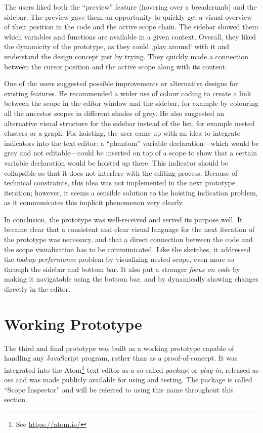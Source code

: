 The users liked both the “preview” feature (hovering over a breadcrumb)
and the sidebar. The preview gave them an opportunity to quickly get a
visual overview of their position in the code and the active scope
chain. The sidebar showed them which variables and functions are
available in a given context. Overall, they liked the dynamicity of the
prototype, as they could ‚play around‘ with it and understand the design
concept just by trying. They quickly made a connection between the
cursor position and the active scope along with its content.

One of the users suggested possible improvements or alternative designs
for existing features. He recommended a wider use of colour coding to
create a link between the scope in the editor window and the sidebar,
for example by colouring all the ancestor scopes in different shades of
grey. He also suggested an alternative visual structure for the sidebar
instead of the list, for example nested clusters or a graph. For
hoisting, the user came up with an idea to integrate indicators into the
text editor: a “phantom” variable declaration—which would be grey and
not editable—could be inserted on top of a scope to show that a certain
variable declaration would be hoisted up there. This indicator should be
collapsible so that it does not interfere with the editing process.
Because of technical constraints, this idea was not implemented in the
next prototype iteration; however, it seems a sensible solution to the
hoisting indication problem, as it communicates this implicit phenomenon
very clearly.

In conclusion, the prototype was well-received and served its purpose
well. It became clear that a consistent and clear visual language for
the next iteration of the prototype was necessary, and that a direct
connection between the code and the scope visualization has to be
communicated. Like the sketches, it addressed the \emph{lookup
performance} problem by visualizing nested scope, even more so through
the sidebar and bottom bar. It also put a stronger \emph{focus on code}
by making it navigatable using the bottom bar, and by dynamically
showing changes directly in the editor.

\newpage

\section{Working Prototype}\label{working-prototype}

The third and final prototype was built as a working prototype capable
of handling any JavaScript program, rather than as a proof-of-concept.
It was integrated into the Atom\footnote{See \url{https://atom.io/}}
text editor as a so-called \emph{package} or \emph{plug-in}, released as
\gls{oss} and was made publicly available for using and testing. The
package is called “Scope Inspector” and will be referred to using this
name throughout this section.

